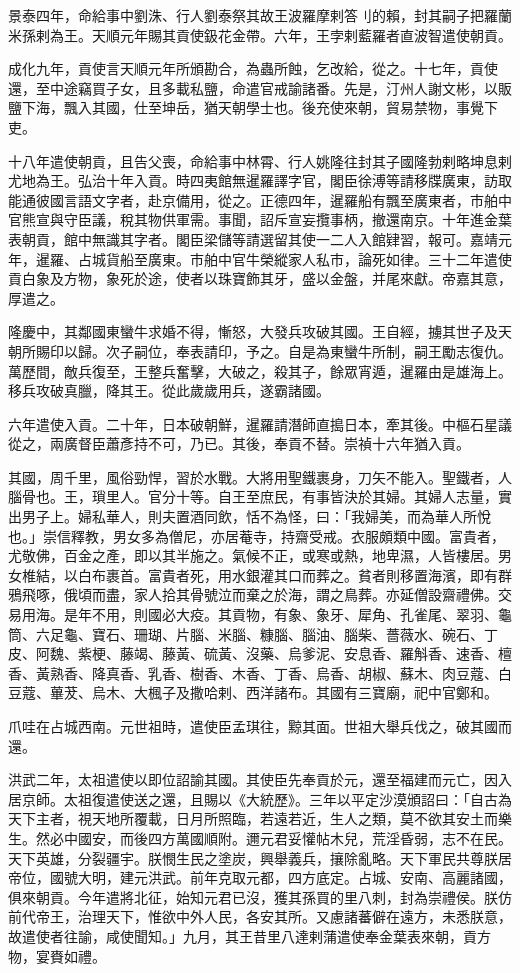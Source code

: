 \begin{pinyinscope}
景泰四年，命給事中劉洙、行人劉泰祭其故王波羅摩剌答刂的賴，封其嗣子把羅蘭米孫剌為王。天順元年賜其貢使鈒花金帶。六年，王孛剌藍羅者直波智遣使朝貢。

成化九年，貢使言天順元年所頒勘合，為蟲所蝕，乞改給，從之。十七年，貢使還，至中途竊買子女，且多載私鹽，命遣官戒諭諸番。先是，汀州人謝文彬，以販鹽下海，飄入其國，仕至坤岳，猶天朝學士也。後充使來朝，貿易禁物，事覺下吏。

十八年遣使朝貢，且告父喪，命給事中林霄、行人姚隆往封其子國隆勃剌略坤息剌尤地為王。弘治十年入貢。時四夷館無暹羅譯字官，閣臣徐溥等請移牒廣東，訪取能通彼國言語文字者，赴京備用，從之。正德四年，暹羅船有飄至廣東者，市舶中官熊宣與守臣議，稅其物供軍需。事聞，詔斥宣妄攬事柄，撤還南京。十年進金葉表朝貢，館中無識其字者。閣臣梁儲等請選留其使一二人入館肄習，報可。嘉靖元年，暹羅、占城貨船至廣東。市舶中官牛榮縱家人私市，論死如律。三十二年遣使貢白象及方物，象死於途，使者以珠寶飾其牙，盛以金盤，并尾來獻。帝嘉其意，厚遣之。

隆慶中，其鄰國東蠻牛求婚不得，慚怒，大發兵攻破其國。王自經，擄其世子及天朝所賜印以歸。次子嗣位，奉表請印，予之。自是為東蠻牛所制，嗣王勵志復仇。萬歷間，敵兵復至，王整兵奮擊，大破之，殺其子，餘眾宵遁，暹羅由是雄海上。移兵攻破真臘，降其王。從此歲歲用兵，遂霸諸國。

六年遣使入貢。二十年，日本破朝鮮，暹羅請潛師直搗日本，牽其後。中樞石星議從之，兩廣督臣蕭彥持不可，乃已。其後，奉貢不替。崇禎十六年猶入貢。

其國，周千里，風俗勁悍，習於水戰。大將用聖鐵裹身，刀矢不能入。聖鐵者，人腦骨也。王，瑣里人。官分十等。自王至庶民，有事皆決於其婦。其婦人志量，實出男子上。婦私華人，則夫置酒同飲，恬不為怪，曰：「我婦美，而為華人所悅也。」崇信釋教，男女多為僧尼，亦居菴寺，持齋受戒。衣服頗類中國。富貴者，尤敬佛，百金之產，即以其半施之。氣候不正，或寒或熱，地卑濕，人皆樓居。男女椎結，以白布裹首。富貴者死，用水銀灌其口而葬之。貧者則移置海濱，即有群鴉飛啄，俄頃而盡，家人拾其骨號泣而棄之於海，謂之鳥葬。亦延僧設齋禮佛。交易用海。是年不用，則國必大疫。其貢物，有象、象牙、犀角、孔雀尾、翠羽、龜筒、六足龜、寶石、珊瑚、片腦、米腦、糠腦、腦油、腦柴、薔薇水、碗石、丁皮、阿魏、紫梗、藤竭、藤黃、硫黃、沒藥、烏爹泥、安息香、羅斛香、速香、檀香、黃熟香、降真香、乳香、樹香、木香、丁香、烏香、胡椒、蘇木、肉豆蔻、白豆蔻、蓽茇、烏木、大楓子及撒哈剌、西洋諸布。其國有三寶廟，祀中官鄭和。

爪哇在占城西南。元世祖時，遣使臣孟琪往，黥其面。世祖大舉兵伐之，破其國而還。

洪武二年，太祖遣使以即位詔諭其國。其使臣先奉貢於元，還至福建而元亡，因入居京師。太祖復遣使送之還，且賜以《大統歷》。三年以平定沙漠頒詔曰：「自古為天下主者，視天地所覆載，日月所照臨，若遠若近，生人之類，莫不欲其安土而樂生。然必中國安，而後四方萬國順附。邇元君妥懽帖木兒，荒淫昏弱，志不在民。天下英雄，分裂疆宇。朕憫生民之塗炭，興舉義兵，攘除亂略。天下軍民共尊朕居帝位，國號大明，建元洪武。前年克取元都，四方底定。占城、安南、高麗諸國，俱來朝貢。今年遣將北征，始知元君已沒，獲其孫買的里八刺，封為崇禮侯。朕仿前代帝王，治理天下，惟欲中外人民，各安其所。又慮諸蕃僻在遠方，未悉朕意，故遣使者往諭，咸使聞知。」九月，其王昔里八達剌蒲遣使奉金葉表來朝，貢方物，宴賚如禮。


\end{pinyinscope}
